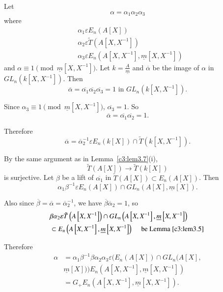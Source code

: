 \begin{Proof}
Let 
$$
\alpha=\alpha_1\alpha_2\alpha_3
$$
where
$$
\begin{aligned}
&\alpha_1\varepsilon E_n(A[X])\\
&\alpha_2\varepsilon \tilde{T}\left(A\left[X,X^{-1}\right]\right)\\
&\alpha_3\varepsilon E_n\left(A\left[X,X^{-1}\right], \underline{m}\left[X,X^{-1}\right]\right)
\end{aligned}
$$
and $\alpha \equiv 1
\pmod{\underline{m}\left[X,X^{-1}\right]}$. Let
$k=\frac{A}{\underline{m}}$ and $\overline{\alpha}$ be the image of
$\alpha$ in $GL_n\left(k\left[X,X^{-1}\right]\right)$. Then 
$$
\overline{\alpha}=\overline{\alpha_1}\overline{\alpha_2}\overline{\alpha_3}=1
\text{ in } GL_n\left(k\left[X,X^{-1}\right]\right).
$$

Since $\alpha_3\equiv
1\pmod{\underline{m}\left[X,X^{-1}\right]}$,
$\overline{\alpha_3}=1$. So 
$$
\overline{\alpha}=\overline{\alpha_1}\overline{\alpha_2}=1.
$$

Therefore
$$
\overline{\alpha}=\overline{\alpha}^{-1}_2\varepsilon E_n(k[X])\cap \tilde{T}\left(k\left[X,X^{-1}\right]\right).
$$

By the same argument as in Lemma~\ref{c3:lem3.7}(i),
$$
\tilde{T}(A[X])\rightarrow \tilde{T}(k[X])
$$
is surjective. Let $\beta$ be a lift of $\overline{\alpha_1}$ in
$\tilde{T}(A[X])\subset E_n(A[X])$. Then 
$$
\alpha_1\beta^{-1}\varepsilon E_n(A[X])\cap GL_n(A[X],\underline{m}[X]).
$$

Also since  $\overline{\beta}=\overline{\alpha}
=\overline{\alpha}_2^{-1}$, we have
$\overline{\beta}\overline{\alpha}_2=1$, so 
$$
\begin{aligned}
&\beta\alpha_2\varepsilon
\tilde{T}\left(A\left[X,X^{-1}\right]\right)\cap
GL_n\left(A\left[X,X^{-1}\right],\underline{m}\left[X,X^{-1}\right]\right)\\
&{}\subset
E_n\left(A\left[X,X^{-1}\right],\underline{m}\left[X,X^{-1}\right]\right)
\quad\text{ be Lemma~\ref{c3:lem3.5} }
\end{aligned}
$$

Therefore
$$
\begin{aligned}
\alpha&=\alpha_1\beta^{-1}\beta\alpha_2\alpha_3\varepsilon
(E_n(A[X])\cap GL_n(A[X],\\
&{}\underline{m}[X]))E_n\left(A\left[X,X^{-1}\right],\underline{m}\left[X,X^{-1}\right]\right)\\
&=G_+E_n\left(A\left[X,X^{-1}\right],\underline{m}\left[X,X^{-1}\right]\right).
\end{aligned}
$$
\enprf
\end{Proof}

